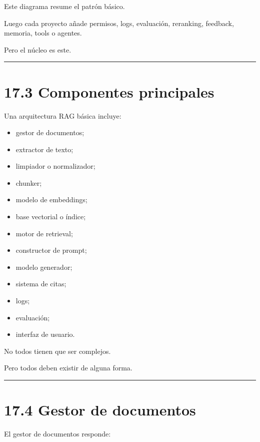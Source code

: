 Este diagrama resume el patrón básico.

Luego cada proyecto añade permisos, logs, evaluación, reranking,
feedback, memoria, tools o agentes.

Pero el núcleo es este.

\begin{center}\rule{0.5\linewidth}{0.5pt}\end{center}

\section{17.3 Componentes principales}\label{componentes-principales}

Una arquitectura RAG básica incluye:

\begin{itemize}
\tightlist
\item
  gestor de documentos;
\item
  extractor de texto;
\item
  limpiador o normalizador;
\item
  chunker;
\item
  modelo de embeddings;
\item
  base vectorial o índice;
\item
  motor de retrieval;
\item
  constructor de prompt;
\item
  modelo generador;
\item
  sistema de citas;
\item
  logs;
\item
  evaluación;
\item
  interfaz de usuario.
\end{itemize}

No todos tienen que ser complejos.

Pero todos deben existir de alguna forma.

\begin{center}\rule{0.5\linewidth}{0.5pt}\end{center}

\section{17.4 Gestor de documentos}\label{gestor-de-documentos}

El gestor de documentos responde:

